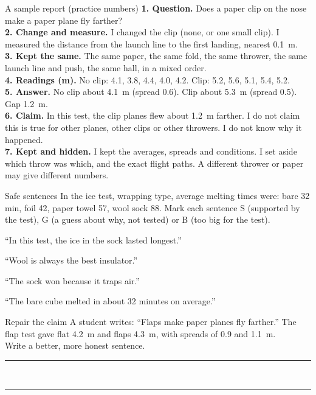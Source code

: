 \begin{worked}{A sample report (practice numbers)}
\textbf{1. Question.} Does a paper clip on the nose make a paper plane fly farther?\\
\textbf{2. Change and measure.} I changed the clip (none, or one small clip). I measured the distance from the launch line to the first landing, nearest 0.1~m.\\
\textbf{3. Kept the same.} The same paper, the same fold, the same thrower, the same launch line and push, the same hall, in a mixed order.\\
\textbf{4. Readings (m).} No clip: 4.1, 3.8, 4.4, 4.0, 4.2. Clip: 5.2, 5.6, 5.1, 5.4, 5.2.\\
\textbf{5. Answer.} No clip about 4.1~m (spread 0.6). Clip about 5.3~m (spread 0.5). Gap 1.2~m.\\
\textbf{6. Claim.} In this test, the clip planes flew about 1.2~m farther. I do not claim this is true for other planes, other clips or other throwers. I do not know why it happened.\\
\textbf{7. Kept and hidden.} I kept the averages, spreads and conditions. I set aside which throw was which, and the exact flight paths. A different thrower or paper may give different numbers.
\end{worked}

\begin{puzzle}{Safe sentences}
In the ice test, wrapping type, average melting times were: bare 32 min, foil 42, paper towel 57, wool sock 88. Mark each sentence S (supported by the test), G (a guess about why, not tested) or B (too big for the test).
\begin{description}[leftmargin=1.6em,itemsep=0.3em,style=sameline]
\item[(a)] ``In this test, the ice in the sock lasted longest.'' \wline[1cm]
\item[(b)] ``Wool is always the best insulator.'' \wline[1cm]
\item[(c)] ``The sock won because it traps air.'' \wline[1cm]
\item[(d)] ``The bare cube melted in about 32 minutes on average.'' \wline[1cm]
\end{description}
\end{puzzle}

\begin{puzzle}{Repair the claim}
A student writes: ``Flaps make paper planes fly farther.'' The flap test gave flat 4.2~m and flaps 4.3~m, with spreads of 0.9 and 1.1~m.\\
Write a better, more honest sentence.\\
\rule{\linewidth}{0.5pt}\\[4pt]\rule{\linewidth}{0.5pt}
\end{puzzle}

